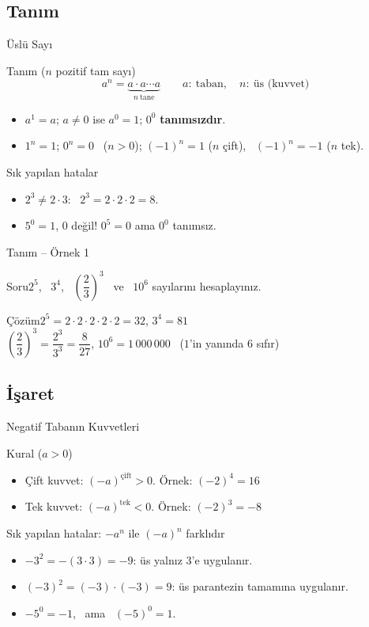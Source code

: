 \documentclass[aspectratio=169,11pt]{beamer}
\newcommand{\soru}[3]{%
\begin{frame}{#1}
  \begin{block}{Soru}\large #2\end{block}
  \pause
  \begin{exampleblock}{Çözüm}\large #3\end{exampleblock}
\end{frame}}
\begin{document}
\subsection{Tanım}
\begin{frame}{Üslü Sayı}
\begin{block}{Tanım (\(n\) pozitif tam sayı)}
\[a^n=\underbrace{a\cdot a\cdots a}_{n\ \text{tane}}\qquad a:\ \text{taban},\quad n:\ \text{üs (kuvvet)}\]
\begin{itemize}
\item \(a^1=a\); \quad \(a\neq 0\) ise \(a^0=1\); \quad \(0^0\) \textbf{tanımsızdır}.
\item \(1^n=1\); \quad \(0^n=0\) \ (\(n>0\)); \quad \((-1)^n=1\) (\(n\) çift), \ \((-1)^n=-1\) (\(n\) tek).
\end{itemize}
\end{block}
\begin{alertblock}{Sık yapılan hatalar}
\begin{itemize}
\item \(2^3\neq 2\cdot 3\): \ \(2^3=2\cdot 2\cdot 2=8\).
\item \(5^0=1\), \(0\) değil! \quad \(0^5=0\) ama \(0^0\) tanımsız.
\end{itemize}
\end{alertblock}
\end{frame}

\soru{Tanım -- Örnek 1}
{\(2^5\), \ \(3^4\), \ \(\left(\dfrac23\right)^3\) \ ve \ \(10^6\) sayılarını hesaplayınız.}
{\(2^5=2\cdot2\cdot2\cdot2\cdot2=32\), \qquad \(3^4=81\)\\[4pt]
\(\left(\dfrac23\right)^3=\dfrac{2^3}{3^3}=\dfrac{8}{27}\), \qquad \(10^6=1\,000\,000\) \ (\(1\)'in yanında \(6\) sıfır)}

\subsection{İşaret}
\begin{frame}{Negatif Tabanın Kuvvetleri}
\begin{block}{Kural (\(a>0\))}
\begin{itemize}
\item Çift kuvvet: \((-a)^{\text{çift}}>0\). \quad Örnek: \((-2)^4=16\)
\item Tek kuvvet: \((-a)^{\text{tek}}<0\). \quad Örnek: \((-2)^3=-8\)
\end{itemize}
\end{block}
\begin{alertblock}{Sık yapılan hatalar: \(-a^n\) ile \((-a)^n\) farklıdır}
\begin{itemize}
\item \(-3^2=-(3\cdot 3)=-9\): üs yalnız \(3\)'e uygulanır.
\item \((-3)^2=(-3)\cdot(-3)=9\): üs parantezin tamamına uygulanır.
\item \(-5^0=-1\), \ ama \ \((-5)^0=1\).
\end{itemize}
\end{alertblock}
\end{frame}
\end{document}
